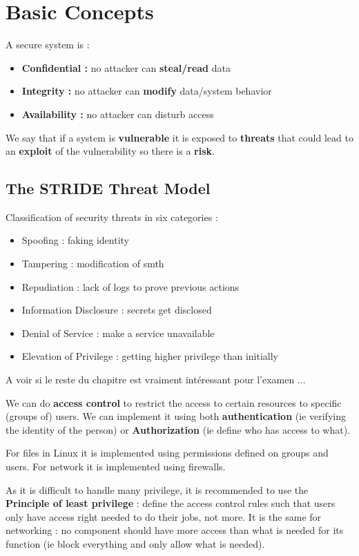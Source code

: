 \section{Basic Concepts}

A secure system is :
\begin{itemize}
    \item \textbf{Confidential :} no attacker can \textbf{steal/read} data
    \item \textbf{Integrity : } no attacker can \textbf{modify} data/system behavior
    \item \textbf{Availability :} no attacker can disturb access 
\end{itemize}
We say that if a system is \textbf{vulnerable} it is exposed to \textbf{threats} that could lead to an \textbf{exploit} of the vulnerability so there is a \textbf{risk}.

\subsection{The STRIDE Threat Model}
Classification of security threats in six categories :
\begin{itemize}
    \item Spoofing : faking identity 
    \item Tampering : modification of smth 
    \item Repudiation : lack of logs to prove previous actions
    \item Information Disclosure : secrets get disclosed
    \item Denial of Service : make a service unavailable 
    \item Elevation of Privilege : getting higher privilege than initially
\end{itemize}

A voir si le reste du chapitre est vraiment intéressant pour l'examen ... 

We can do \textbf{access control} to restrict the access to certain resources to specific (groups of) users. We can implement it using both \textbf{authentication} (ie verifying the identity of the person) or \textbf{Authorization} (ie define who has access to what).

For files in Linux it is implemented using permissions defined on groups and users. For network it is implemented using firewalls.

As it is difficult to handle many privilege, it is recommended to use the \textbf{Principle of least privilege} : define the access control rules such that users only have access right needed to do their jobs, not more. It is the same for networking : no component should have more access than what is needed for its function (ie block everything and only allow what is needed).




